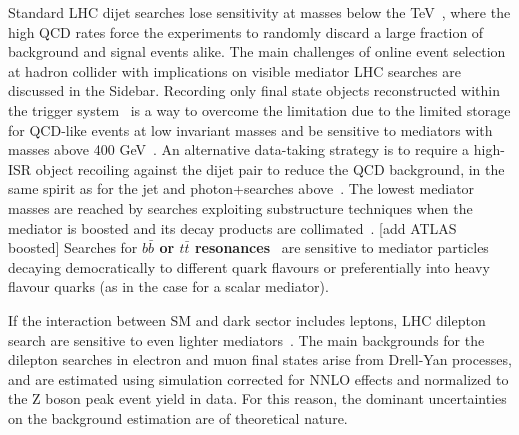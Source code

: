 

Standard LHC dijet searches lose sensitivity at masses below the TeV~\cite{An:2012ue,Dobrescu:2013coa}, where the high QCD rates force the experiments to randomly discard a large fraction of background and signal events alike. The main challenges of online event selection at hadron collider with implications on visible mediator LHC searches are discussed in the Sidebar. 
Recording only final state objects reconstructed within the trigger system~\cite{Aaij:2016rxn,CMS-PAS-EXO-16-056,Aaboud:2016leb} is a way to overcome the limitation due to the limited storage for QCD-like events at low invariant masses and be sensitive to mediators with masses
above 400 GeV~\cite{CMS-PAS-EXO-16-056,ATLAS:2016xiv}. 
An alternative data-taking strategy is to require a high-\pt{} ISR object recoiling against the dijet pair to reduce the QCD background, in the same spirit as for the jet and photon+\MET searches above~\cite{ATLAS:2016bvn,Sirunyan:2017nvi}. The lowest mediator masses are reached by searches exploiting substructure techniques when the mediator is boosted and its decay products are collimated~\cite{Sirunyan:2017nvi}.
[add ATLAS boosted]
Searches for \textbf{$b\bar{b}$ or $t\bar{t}$ resonances}~\cite{lowMassDiB,CMS-PAS-HIG-16-025,Aaboud:2017hnm} are sensitive to
mediator particles decaying democratically to different quark flavours or preferentially into heavy flavour quarks (as in the case for a scalar mediator).

If the interaction between SM and dark sector includes leptons, LHC dilepton search are sensitive to even lighter mediators~\cite{Aaboud:2017buh,Khachatryan:2016zqb}. 
The main backgrounds for the dilepton searches in electron and muon final states arise from Drell-Yan processes, and are estimated using simulation corrected for NNLO effects and normalized to the Z boson peak event yield in data. For this reason, the dominant uncertainties on the background estimation are of theoretical nature. 



